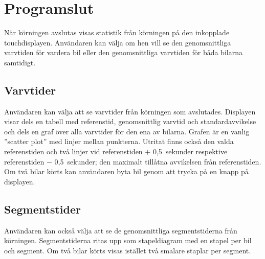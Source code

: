 \section{Programslut}
\label{sec:programslut}

När körningen avslutas visas statistik från körningen på den inkopplade
touchdisplayen. Användaren kan välja om hen vill se den genomsnittliga varvtiden
för vardera bil eller den genomsnittliga varvtiden för båda bilarna samtidigt.

\subsection{Varvtider}

Användaren kan välja att se varvtider från körningen som avslutades. Displayen
visar dels en tabell med referenstid, genomsnittlig varvtid och
standardavvikelse och dels en graf över alla varvtider för den ena av bilarna.
Grafen är en vanlig ''scatter plot'' med linjer mellan punkterna. Utritat finns
också den valda referenstiden och två linjer vid referenstiden $+$ 0,5~sekunder
respektive referenstiden $-$ 0,5~sekunder; den maximalt tillåtna avvikelsen från
referenstiden. Om två bilar körts kan användaren byta bil genom att trycka på en
knapp på displayen.

\subsection{Segmentstider}

Användaren kan också välja att se de genomsnittliga segmentstiderna från
körningen. Segmentstiderna ritas upp som stapeldiagram med en stapel per bil och
segment. Om två bilar körts visas istället två smalare staplar per segment.

